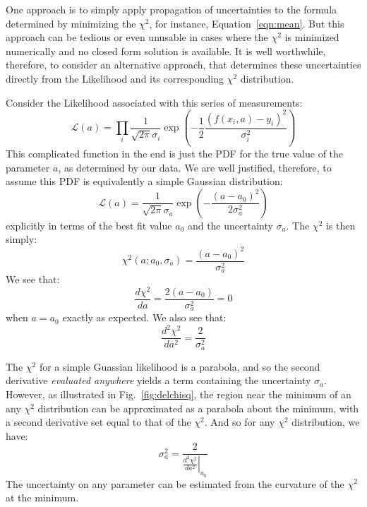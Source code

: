 \documentclass[12pt,oneside]{book}
\begin{document}
One approach is to simply apply propagation of uncertainties to the
formula determined by minimizing the $\chi^2$, for instance,
Equation~\ref{eqn:mean}.  But this approach can be tedious or even
unusable in cases where the $\chi^2$ is minimized numerically and no
closed form solution is available.  It is well worthwhile, therefore,
to consider an alternative approach, that determines these
uncertainties directly from the Likelihood and its corresponding
$\chi^2$ distribution.

Consider the Likelihood associated with this series of measurements:
\begin{displaymath}
\mathcal{L}(a) = \prod_i \frac{1}{\sqrt{2\pi} \sigma_i} \exp\left(-\frac{1}{2} \frac{(f(x_i,a)-y_i)^2}{\sigma_i^2}\right)
\end{displaymath}
This complicated function in the end is just the PDF for the true value of the parameter $a$, as determined by our data.  We are well justified, therefore, to assume this PDF is equivalently a simple Gaussian distribution: 
\begin{displaymath}
\mathcal{L}(a) =  \frac{1}{\sqrt{2\pi} \sigma_a} \exp\left(-\frac{(a-a_0)^2}{2\sigma_a^2}\right)
\end{displaymath}
explicitly in terms of the best fit value $a_0$ and the uncertainty $\sigma_a$.  The $\chi^2$ is then simply:
\begin{equation} \label{eqn:chisqa}
\chi^2(a; a_0, \sigma_a) = \frac{(a-a_0)^2}{\sigma_a^2}
\end{equation}
We see that:
\begin{displaymath}
\frac{d\chi^2}{da} = \frac{2 (a-a_0)}{\sigma_a^2} = 0
\end{displaymath}
when $a=a_0$ exactly as expected.  We also see that:
\begin{displaymath}
\frac{d^2\chi^2}{da^2} = \frac{2}{\sigma_a^2}
\end{displaymath}

The $\chi^2$ for a simple Guassian likelihood is a parabola, and so
the second derivative {\em evaluated anywhere} yields a term
containing the uncertainty $\sigma_a$.  However, as illustrated in
Fig.~\ref{fig:delchisq}, the region near the minimum of an any
$\chi^2$ distribution can be approximated as a parabola about the
minimum, with a second derivative set equal to that of the $\chi^2$.
And so for any $\chi^2$ distribution, we have:
\begin{equation} \label{eqn:chisqunc}
\sigma_a^2  = \frac{2}{\left. \frac{d^2\chi^2}{da^2} \right|_{a_0}}
\end{equation}
The uncertainty on any parameter can be estimated from the curvature of the $\chi^2$ at the minimum.
\end{document}
